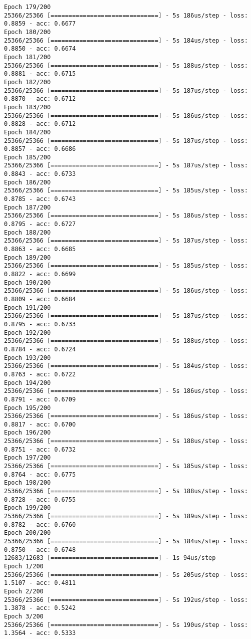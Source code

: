 \documentclass[11pt]{article}
\begin{document}
\begin{Verbatim}[commandchars=\\\{\}]
Epoch 179/200
25366/25366 [==============================] - 5s 186us/step - loss: 0.8859 - acc: 0.6677
Epoch 180/200
25366/25366 [==============================] - 5s 184us/step - loss: 0.8850 - acc: 0.6674
Epoch 181/200
25366/25366 [==============================] - 5s 188us/step - loss: 0.8881 - acc: 0.6715
Epoch 182/200
25366/25366 [==============================] - 5s 187us/step - loss: 0.8870 - acc: 0.6712
Epoch 183/200
25366/25366 [==============================] - 5s 186us/step - loss: 0.8828 - acc: 0.6712
Epoch 184/200
25366/25366 [==============================] - 5s 187us/step - loss: 0.8857 - acc: 0.6686
Epoch 185/200
25366/25366 [==============================] - 5s 187us/step - loss: 0.8843 - acc: 0.6733
Epoch 186/200
25366/25366 [==============================] - 5s 185us/step - loss: 0.8785 - acc: 0.6743
Epoch 187/200
25366/25366 [==============================] - 5s 186us/step - loss: 0.8795 - acc: 0.6727
Epoch 188/200
25366/25366 [==============================] - 5s 187us/step - loss: 0.8863 - acc: 0.6685
Epoch 189/200
25366/25366 [==============================] - 5s 185us/step - loss: 0.8822 - acc: 0.6699
Epoch 190/200
25366/25366 [==============================] - 5s 186us/step - loss: 0.8809 - acc: 0.6684
Epoch 191/200
25366/25366 [==============================] - 5s 187us/step - loss: 0.8795 - acc: 0.6733
Epoch 192/200
25366/25366 [==============================] - 5s 188us/step - loss: 0.8784 - acc: 0.6724
Epoch 193/200
25366/25366 [==============================] - 5s 184us/step - loss: 0.8763 - acc: 0.6722
Epoch 194/200
25366/25366 [==============================] - 5s 186us/step - loss: 0.8791 - acc: 0.6709
Epoch 195/200
25366/25366 [==============================] - 5s 186us/step - loss: 0.8817 - acc: 0.6700
Epoch 196/200
25366/25366 [==============================] - 5s 188us/step - loss: 0.8751 - acc: 0.6732
Epoch 197/200
25366/25366 [==============================] - 5s 185us/step - loss: 0.8764 - acc: 0.6775
Epoch 198/200
25366/25366 [==============================] - 5s 188us/step - loss: 0.8728 - acc: 0.6755
Epoch 199/200
25366/25366 [==============================] - 5s 189us/step - loss: 0.8782 - acc: 0.6760
Epoch 200/200
25366/25366 [==============================] - 5s 184us/step - loss: 0.8750 - acc: 0.6748
12683/12683 [==============================] - 1s 94us/step
Epoch 1/200
25366/25366 [==============================] - 5s 205us/step - loss: 1.5107 - acc: 0.4811
Epoch 2/200
25366/25366 [==============================] - 5s 192us/step - loss: 1.3878 - acc: 0.5242
Epoch 3/200
25366/25366 [==============================] - 5s 190us/step - loss: 1.3564 - acc: 0.5333

\end{Verbatim}
\end{document}
